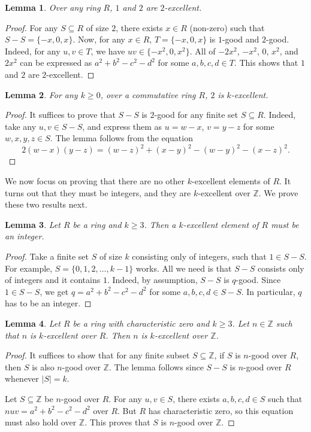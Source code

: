 \documentclass{article}
\newcommand{\Z}{\mathbb{Z}}
\newtheorem{lemma}{Lemma}
\begin{document}
\begin{lemma}\label{2017a2-1}
Over any ring $R$, $1$ and $2$ are $2$-excellent.
\end{lemma}
\begin{proof}
For any $S \subseteq R$ of size $2$, there exists $x \in R$ (non-zero) such that $S - S = \{-x, 0, x\}$.
Now, for any $x \in R$, $T = \{-x, 0, x\}$ is $1$-good and $2$-good.
Indeed, for any $u, v \in T$, we have $uv \in \{-x^2, 0, x^2\}$.
All of $-2x^2$, $-x^2$, $0$, $x^2$, and $2x^2$ can be expressed as $a^2 + b^2 - c^2 - d^2$ for some $a, b, c, d \in T$.
This shows that $1$ and $2$ are $2$-excellent.
\end{proof}

\begin{lemma}\label{2017a2-2}
For any $k \geq 0$, over a commutative ring $R$, $2$ is $k$-excellent.
\end{lemma}
\begin{proof}
It suffices to prove that $S - S$ is $2$-good for any finite set $S \subseteq R$.
Indeed, take any $u, v \in S - S$, and express them as $u = w - x$, $v = y - z$ for some $w, x, y, z \in S$.
The lemma follows from the equation
\[ 2(w - x)(y - z) = (w - z)^2 + (x - y)^2 - (w - y)^2 - (x - z)^2. \]
\end{proof}

We now focus on proving that there are no other $k$-excellent elements of $R$.
It turns out that they must be integers, and they are $k$-excellent over $\Z$.
We prove these two results next.

\begin{lemma}\label{2017a2-3}
Let $R$ be a ring and $k \geq 3$.
Then a $k$-excellent element of $R$ must be an integer.
\end{lemma}
\begin{proof}
Take a finite set $S$ of size $k$ consisting only of integers, such that $1 \in S - S$.
For example, $S = \{0, 1, 2, \ldots, k - 1\}$ works.
All we need is that $S - S$ consists only of integers and it contains $1$.
Indeed, by assumption, $S - S$ is $q$-good.
Since $1 \in S - S$, we get $q = a^2 + b^2 - c^2 - d^2$ for some $a, b, c, d \in S - S$.
In particular, $q$ has to be an integer.
\end{proof}

\begin{lemma}\label{2017a2-4}
Let $R$ be a ring with characteristic zero and $k \geq 3$.
Let $n \in \Z$ such that $n$ is $k$-excellent over $R$.
Then $n$ is $k$-excellent over $\Z$.
\end{lemma}
\begin{proof}
It suffices to show that for any finite subset $S \subseteq \Z$, if $S$ is $n$-good over $R$, then $S$ is also $n$-good over $\Z$.
The lemma follows since $S - S$ is $n$-good over $R$ whenever $|S| = k$.

Let $S \subseteq \Z$ be $n$-good over $R$.
For any $u, v \in S$, there exists $a, b, c, d \in S$ such that $nuv = a^2 + b^2 - c^2 - d^2$ over $R$.
But $R$ has characteristic zero, so this equation must also hold over $\Z$.
This proves that $S$ is $n$-good over $\Z$.
\end{proof}
\end{document}
